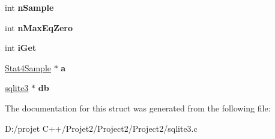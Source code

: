 \begin{DoxyCompactItemize}
int {\bfseries n\+Sample}
\item 
\mbox{\label{struct_stat4_accum_a7da60d287b0f08aa813fa546c9559431}} 
int {\bfseries n\+Max\+Eq\+Zero}
\item 
\mbox{\label{struct_stat4_accum_aee70ce1c45daa00581265d27337bce5e}} 
int {\bfseries i\+Get}
\item 
\mbox{\label{struct_stat4_accum_a921a2a1d92fe8113626bde517d004278}} 
\mbox{\hyperlink{struct_stat4_sample}{Stat4\+Sample}} $\ast$ {\bfseries a}
\item 
\mbox{\label{struct_stat4_accum_af0ae3ddd7a24a925ebe090db6f06a12b}} 
\mbox{\hyperlink{structsqlite3}{sqlite3}} $\ast$ {\bfseries db}
\end{DoxyCompactItemize}


The documentation for this struct was generated from the following file\+:\begin{DoxyCompactItemize}
\item 
D\+:/projet C++/\+Projet2/\+Project2/\+Project2/sqlite3.\+c\end{DoxyCompactItemize}
